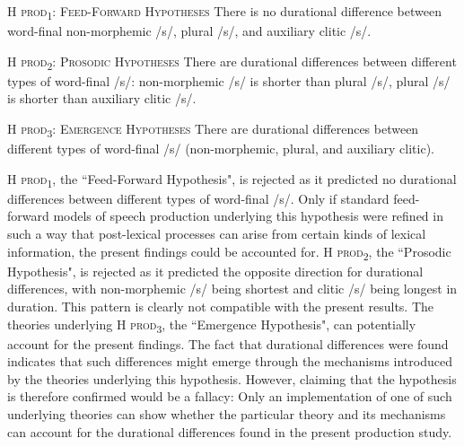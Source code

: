 \begin{description}
\item\textsc{H prod\textsubscript{1}}: \textsc{Feed-Forward Hypotheses} \newline
There is no durational difference between word-final non-morphemic /s/, plural /s/, and auxiliary clitic /s/.

\item\textsc{H prod\textsubscript{2}}: \textsc{Prosodic Hypotheses} \newline
There are durational differences between different types of word-final /s/: 
non-morphemic /s/ is shorter than plural /s/, plural /s/ is shorter than auxiliary clitic /s/.

\item\textsc{H prod\textsubscript{3}}: \textsc{Emergence Hypotheses} \newline
There are durational differences between different types of word-final /s/ (non-morphemic, plural, and auxiliary clitic).
\end{description}

\textsc{H prod\textsubscript{1}}, the ``Feed-Forward Hypothesis", is rejected as it predicted no durational differences between different types of word-final /s/. Only if standard feed-forward models of speech production underlying this hypothesis were refined in such a way that post-lexical processes can arise from certain kinds of lexical information, the present findings could be accounted for. \textsc{H prod\textsubscript{2}}, the ``Prosodic Hypothesis", is rejected as it predicted the opposite direction for durational differences, with non-morphemic /s/ being shortest and clitic /s/ being longest in duration. This pattern is clearly not compatible with the present results. The theories underlying \textsc{H prod\textsubscript{3}}, the ``Emergence Hypothesis", can potentially account for the present findings. The fact that durational differences were found indicates that such differences might emerge through the mechanisms introduced by the theories underlying this hypothesis. However, claiming that the hypothesis is therefore confirmed would be a fallacy: Only an implementation of one of such underlying theories can show whether the particular theory and its mechanisms can account for the durational differences found in the present production study.

